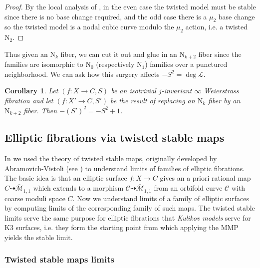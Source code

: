 \documentclass[11pt]{amsart}
\newtheorem{cor}[theorem]{Corollary}
\theoremstyle{definition}
\theoremstyle{remark}
\newcommand{\calM}{\mathcal M}
\newcommand{\calC}{\mathcal C}
\begin{document}
	\begin{proof} By the local analysis of \cite[Section 6.2]{tsm}, in the even case the twisted model must be stable since there is no base change required, and the odd case there is a $\mu_2$ base change so the twisted model is a nodal cubic curve modulo the $\mu_2$ action, i.e. a twisted $\mathrm{N}_2$. \end{proof}
	
	Thus given an $\mathrm{N}_{k}$ fiber, we can cut it out and glue in an $\mathrm{N}_{k + 2}$ fiber since the families are isomorphic to $\mathrm{N}_0$ (respectively $\mathrm{N}_1$) families over a punctured neighborhood. We can ask how this surgery affects $-S^2 = \deg \mathscr{L}$.
	
	\begin{cor}\label{cor:jinftyfibers} Let $(f : X \to C, S)$ be an isotrivial $j$-invariant $\infty$ Weierstrass fibration and let $(f : X' \to C, S')$ be the result of replacing an $\mathrm{N}_k$ fiber by an $\mathrm{N}_{k + 2}$ fiber. Then $-(S')^2 = -S^2 + 1$. 
	\end{cor} 
	
	
	
	
	
	
	\subsection{Elliptic fibrations via twisted stable maps}\label{sec:tsm}
	
	In \cite{tsm} we used the theory of twisted stable maps, originally developed by Abramovich-Vistoli (see \cite{av, av2}) to understand limits of families of elliptic fibrations. The basic idea is that an elliptic surface $f : X \to C$ gives an a priori rational map $C \dashrightarrow \overline{\calM}_{1,1}$ which extends to a morphism $\calC \dashrightarrow \overline{\calM}_{1,1}$ from an orbifold curve $\calC$ with coarse moduli space $C$. Now we understand limits of a family of elliptic surfaces by computing limits of the corresponding family of such maps. The twisted stable limits serve the same purpose for elliptic fibrations that \emph{Kulikov models} serve for K3 surfaces, i.e. they form the starting point from which applying the MMP yields the stable limit. 
	
	\subsubsection{Twisted stable maps limits} 
	
\end{document}
